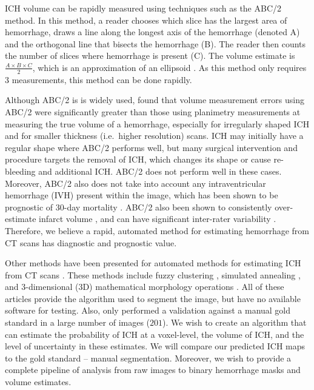 \documentclass[12pt]{report}
\begin{document}
\begin{refsection}
ICH volume can be rapidly measured using techniques such as the ABC/2 method.  In this method, a reader chooses which slice has the largest area of hemorrhage, draws a line along the longest axis of the hemorrhage (denoted A) and the orthogonal line that bisects the hemorrhage (B).  The reader then counts the number of slices where hemorrhage is present (C).  The volume estimate is $\frac{A\times B\times C}{2}$, which is an approximation of an ellipsoid \citep{kothari_abcs_1996}.  As this method only requires 3 measurements, this method can be done rapidly. 

Although ABC/2 is is widely used, \citet{divani_abcs_2011} found that volume measurement errors using ABC/2 were significantly greater than those using planimetry measurements at measuring the true volume of a hemorrhage, especially for irregularly shaped ICH and for smaller thickness (i.e.~higher resolution) scans.  ICH may initially have a regular shape where ABC/2 performs well, but many surgical intervention and procedure targets the removal of ICH, which changes its shape or cause re-bleeding and additional ICH.  ABC/2 does not perform well in these cases.  Moreover, ABC/2 also does not take into account any intraventricular hemorrhage (IVH) present within the image, which has been shown to be prognostic of 30-day mortality \citep{hemphill_ich_2001, tuhrim_volume_1999}.  ABC/2 also been shown to consistently over-estimate infarct volume \citep{pedraza_reliability_2012}, and can have significant inter-rater variability \citep{hussein_reliability_2013}. Therefore, we believe a rapid, automated method for estimating hemorrhage from CT scans has diagnostic and prognostic value.

Other methods have been presented for automated methods for estimating ICH from CT scans \citep{ prakash_segmentation_2012, loncaric_hierarchical_1996, loncaric_quantitative_1999, perez_set_2007}.  These methods include fuzzy clustering \citep{prakash_segmentation_2012}, simulated annealing \citep{loncaric_quantitative_1999}, and 3-dimensional (3D) mathematical morphology operations \citep{perez_set_2007}.  All of these articles provide the algorithm used to segment the image, but have no available software for testing.  Also, only \citet{prakash_segmentation_2012} performed a validation against a manual gold standard in a large number of images ($201$).  We wish to create an algorithm that can estimate the probability of ICH at a voxel-level, the volume of ICH, and the level of uncertainty in these estimates.  We will compare our predicted ICH maps to the gold standard -- manual segmentation.  Moreover, we wish to provide a complete pipeline of analysis from raw images to binary hemorrhage masks and volume estimates. 



\end{refsection}
\end{document}
